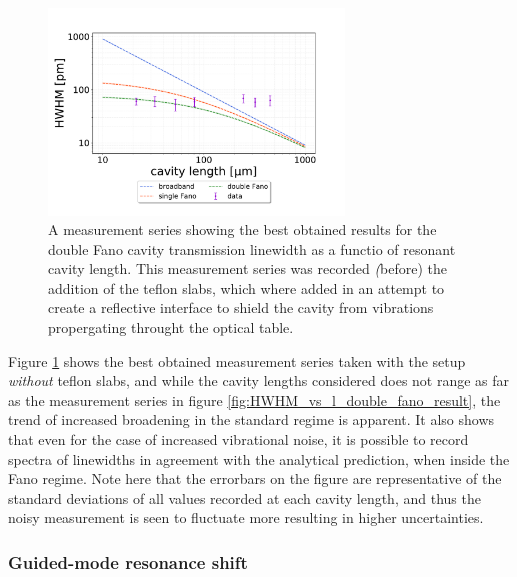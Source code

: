 \begin{figure}[h!]
    \centering
    \includegraphics[width=0.7\textwidth]{figures/results/double fano fits/HWHM_vs_cavity_length_result_2nd_measurement_only.pdf}
    \caption{A measurement series showing the best obtained results for the double Fano cavity transmission linewidth as a functio of resonant cavity length. This measurement series was recorded \emph(before) the addition of the teflon slabs, which where added in an attempt to create a reflective interface to shield the cavity from vibrations propergating throught the optical table.}
    \label{fig:HWHM_vs_l_double_fano_noisy}
\end{figure}

Figure \ref{fig:HWHM_vs_l_double_fano_noisy} shows the best obtained measurement series taken with the setup \emph{without} teflon slabs, and while the cavity lengths considered does not range as far as the measurement series in figure \ref{fig:HWHM_vs_l_double_fano_result}, the trend of increased broadening in the standard regime is apparent. It also shows that even for the case of increased vibrational noise, it is possible to record spectra of linewidths in agreement with the analytical prediction, when inside the Fano regime. Note here that the errorbars on the figure are representative of the standard deviations of all values recorded at each cavity length, and thus the noisy measurement is seen to fluctuate more resulting in higher uncertainties. 

\subsubsection{Guided-mode resonance shift}


